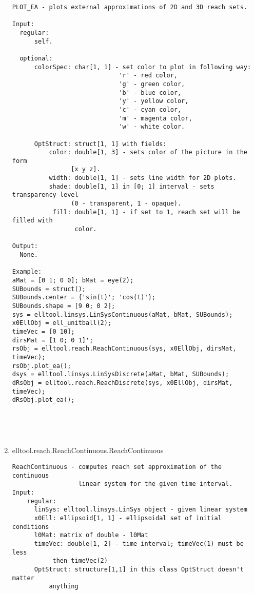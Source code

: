 \begin{enumerate}
\begin{lstlisting}
PLOT_EA - plots external approximations of 2D and 3D reach sets.

Input:
  regular:
      self.

  optional:
      colorSpec: char[1, 1] - set color to plot in following way:
                             'r' - red color,
                             'g' - green color,
                             'b' - blue color,
                             'y' - yellow color,
                             'c' - cyan color,
                             'm' - magenta color,
                             'w' - white color.

      OptStruct: struct[1, 1] with fields:
          color: double[1, 3] - sets color of the picture in the form
                [x y z].
          width: double[1, 1] - sets line width for 2D plots.
          shade: double[1, 1] in [0; 1] interval - sets transparency level
                (0 - transparent, 1 - opaque).
           fill: double[1, 1] - if set to 1, reach set will be filled with
                 color.

Output:
  None.

Example:
aMat = [0 1; 0 0]; bMat = eye(2);
SUBounds = struct();
SUBounds.center = {'sin(t)'; 'cos(t)'};
SUBounds.shape = [9 0; 0 2];
sys = elltool.linsys.LinSysContinuous(aMat, bMat, SUBounds);
x0EllObj = ell_unitball(2);
timeVec = [0 10];
dirsMat = [1 0; 0 1]';
rsObj = elltool.reach.ReachContinuous(sys, x0EllObj, dirsMat, timeVec);
rsObj.plot_ea();
dsys = elltool.linsys.LinSysDiscrete(aMat, bMat, SUBounds);
dRsObj = elltool.reach.ReachDiscrete(sys, x0EllObj, dirsMat, timeVec);
dRsObj.plot_ea();





\end{lstlisting}
\fontfamily{\familydefault}
\selectfont
\item {elltool.reach.ReachContinuous.ReachContinuous}
\selectfont
\begin{lstlisting}
ReachContinuous - computes reach set approximation of the continuous
                  linear system for the given time interval.
Input:
    regular:
      linSys: elltool.linsys.LinSys object - given linear system
      x0Ell: ellipsoid[1, 1] - ellipsoidal set of initial conditions
      l0Mat: matrix of double - l0Mat
      timeVec: double[1, 2] - time interval; timeVec(1) must be less
           then timeVec(2)
      OptStruct: structure[1,1] in this class OptStruct doesn't matter
          anything


\end{lstlisting}
\end{enumerate}

